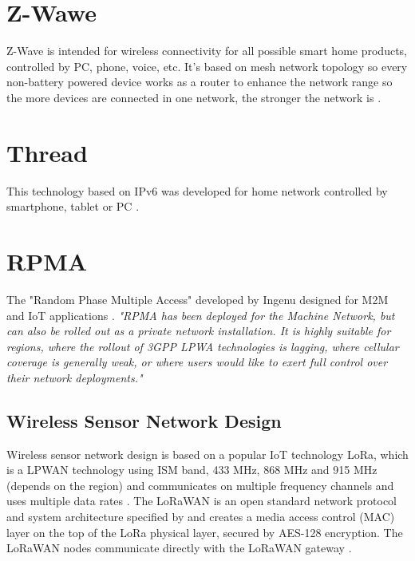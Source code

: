 \section{Z-Wawe}
Z-Wave is intended for wireless connectivity for all possible smart home products, controlled by PC, phone, voice, etc. It's based on mesh network topology so every non-battery powered device works as a router to enhance the network range so the more devices are connected in one network, the stronger the network is \cite{27} \cite{28}.


\section{Thread}
This technology based on IPv6 was developed for home network controlled by smartphone, tablet or PC \cite{29} \cite{30} \cite{31}.


\section{RPMA}
The "Random Phase Multiple Access" developed by Ingenu designed for M2M and IoT applications \cite{32} \cite{rpma_ublox} \cite{34}. \textit{"RPMA has been deployed for the Machine Network, but can also be rolled out as a private network installation. It is highly suitable for regions, where the rollout of 3GPP LPWA technologies is lagging, where cellular coverage is generally weak, or where users would like to exert full control over their network deployments."}\cite{rpma_ublox}






\subsection{Wireless Sensor Network Design}
Wireless sensor network design is based on a popular IoT technology LoRa, which is a LPWAN technology using ISM band, 433 MHz, 868 MHz and 915 MHz (depends on the region) and communicates on multiple frequency channels and uses multiple data rates \cite{LoRaWAN Evaluation for IoT Communications}.
The LoRaWAN is an open standard network protocol and system architecture specified by \cite{LoRaWAN specification} and creates a media access control (MAC) layer on the top of the LoRa physical layer, secured by AES-128 encryption.
The LoRaWAN nodes communicate directly with the LoRaWAN gateway \cite{Internet of Things (IoT) using LoRa technology}.


